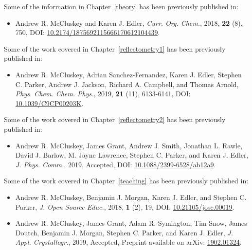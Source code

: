 \documentclass[
11pt, %
chapterinoneline,%
english, %
onehalfspacing
liststotoc, %
parskip, %
headsepline, %
]{reports/MastersDoctoralThesis} %
\begin{document}
\begin{pubsstatement}
\addchaptertocentry{\pubsname} %

Some of the information in Chapter~\ref{theory} has been previously published in:
\begin{itemize}
  \item Andrew R. McCluskey and Karen J. Edler, \emph{Curr. Org. Chem.}, 2018, \textbf{22} (8), 750, DOI: \href{https://doi.org/10.2174/1875692115666170612104439}{10.2174/1875692115666170612104439}.
\end{itemize}
Some of the work covered in Chapter~\ref{reflectometry1} has been previously published in:
\begin{itemize}
  \item Andrew R. McCluskey, Adrian Sanchez-Fernandez, Karen J. Edler, Stephen C. Parker, Andrew J. Jackson, Richard A. Campbell, and Thomas Arnold, \emph{Phys. Chem. Chem. Phys.}, 2019, \textbf{21} (11), 6133-6141, DOI: \href{https://doi.org/10.1039/C9CP00203K}{10.1039/C9CP00203K}.
\end{itemize}
Some of the work covered in Chapter~\ref{reflectometry2} has been previously published in:
\begin{itemize}
  \item Andrew R. McCluskey, James Grant, Andrew J. Smith, Jonathan L. Rawle, David J. Barlow, M. Jayne Lawrence, Stephen C. Parker, and Karen J. Edler, \emph{J. Phys. Comm.}, 2019, Accepted, DOI: \href{https://doi.org/10.1088/2399-6528/ab12a9}{10.1088/2399-6528/ab12a9}.
\end{itemize}
Some of the work covered in Chapter~\ref{teaching} has been previously published in:
\begin{itemize}
  \item Andrew R. McCluskey, Benjamin J. Morgan, Karen J. Edler, and Stephen C. Parker, \emph{J. Open Source Educ.}, 2018, \textbf{1} (2), 19, DOI: \href{https://doi.org/10.21105/jose.00019}{10.21105/jose.00019}.
  \item Andrew R. McCluskey, James Grant, Adam R. Symington, Tim Snow, James Doutch, Benjamin J. Morgan, Stephen C. Parker, and Karen J. Edler, \emph{J. Appl. Crystallogr.}, 2019, Accepted, Preprint available on arXiv: \href{https://arxiv.org/abs/1902.01324}{1902.01324}.
\end{itemize}
\end{pubsstatement}


\end{document}
